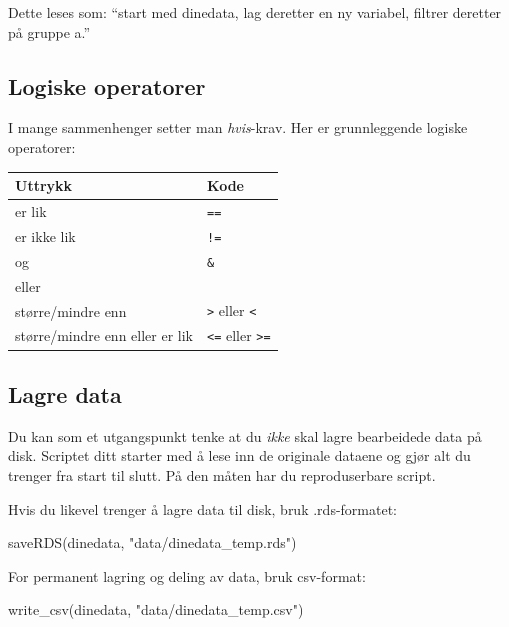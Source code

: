 \documentclass[
  norsk,
  letterpaper,
  DIV=11,
  numbers=noendperiod]{scrreprt}
\newenvironment{Shaded}{\begin{snugshade}}{\end{snugshade}}
\newcommand{\FunctionTok}[1]{\textcolor[rgb]{0.28,0.35,0.67}{#1}}
\newcommand{\NormalTok}[1]{\textcolor[rgb]{0.00,0.23,0.31}{#1}}
\newcommand{\StringTok}[1]{\textcolor[rgb]{0.13,0.47,0.30}{#1}}
\theoremstyle{definition}
\theoremstyle{remark}
\begin{document}
Dette leses som: ``start med dinedata, lag deretter en ny variabel,
filtrer deretter på gruppe a.''

\subsection{Logiske operatorer}\label{logiske-operatorer}

I mange sammenhenger setter man \emph{hvis}-krav. Her er grunnleggende
logiske operatorer:

\begin{longtable}[]{@{}ll@{}}
\toprule\noalign{}
Uttrykk & Kode \\
\midrule\noalign{}
\endhead
\bottomrule\noalign{}
\endlastfoot
er lik & \texttt{==} \\
er ikke lik & \texttt{!=} \\
og & \texttt{\&} \\
eller & \texttt{\textbar{}} \\
større/mindre enn & \texttt{\textgreater{}} eller
\texttt{\textless{}} \\
større/mindre enn eller er lik & \texttt{\textless{}=} eller
\texttt{\textgreater{}=} \\
\end{longtable}

\subsection{Lagre data}\label{lagre-data}

Du kan som et utgangspunkt tenke at du \emph{ikke} skal lagre
bearbeidede data på disk. Scriptet ditt starter med å lese inn de
originale dataene og gjør alt du trenger fra start til slutt. På den
måten har du reproduserbare script.

Hvis du likevel trenger å lagre data til disk, bruk .rds-formatet:

\begin{Shaded}
\begin{Highlighting}[]
\FunctionTok{saveRDS}\NormalTok{(dinedata, }\StringTok{"data/dinedata\_temp.rds"}\NormalTok{)}
\end{Highlighting}
\end{Shaded}

For permanent lagring og deling av data, bruk csv-format:

\begin{Shaded}
\begin{Highlighting}[]
\FunctionTok{write\_csv}\NormalTok{(dinedata, }\StringTok{"data/dinedata\_temp.csv"}\NormalTok{)}
\end{Highlighting}
\end{Shaded}
\end{document}
